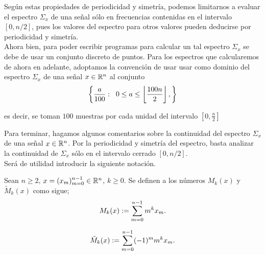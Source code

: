 \begin{nota}
\label{nota: muestreo dom frecuencia}
Según estas propiedades de periodicidad y simetría,
podemos limitarnos a evaluar el espectro
$\Sigma_{x}$ de una señal sólo en frecuencias
contenidas en el intervalo $[0, n/2]$, pues los valores
del espectro para otros valores pueden deducirse por periodicidad
y simetría. \\

Ahora bien, para poder escribir programas
para calcular un tal espectro $\Sigma_{x}$
se debe de usar
un conjunto discreto de puntos.
Para los espectros que calcularemos de ahora en 
adelante, adoptamos la convención de 
usar usar como dominio 
del espectro
$\Sigma_{x}$ de una señal $x \in \mathbb{R}^{n}$
al conjunto
\begin{equation}
\label{eq: malla frecuencias}
\left\{ \frac{a}{100} : \hspace{0.2cm}
0 \leq a \leq 
\left\lfloor\frac{100n}{2}\right\rfloor,
\right\}
\end{equation}

\noindent
es decir, se toman $100$ muestras por
cada unidad del intervalo 
$\left[ 0, \frac{n}{2}\right]$
\end{nota}


Para terminar, hagamos algunos comentarios
sobre la continuidad del espectro $\Sigma_{x}$
de una señal $x \in \mathbb{R}^{n}$.
Por la periodicidad y simetría del espectro, basta
analizar la continuidad de $\Sigma_{x}$ sólo en el
intervalo cerrado $[0, n/2]$. \\

Será de utilidad introducir la siguiente notación.
\begin{defi}
\label{def: momentos de x}
Sean $n \geq 2$, $x= (x_{m})_{m=0}^{n-1} \in \mathbb{R}^{n}$, $k \geq 0$.
Se definen a los números $M_{k}(x)$ y 
$\tilde{M}_{k}(x)$ como sigue;
	\begin{equation}
	\label{eq: momento k esimo de x}
	M_{k}(x) := \sum\limits_{m=0}^{n-1}m^{k}x_{m}.
	\end{equation}
	
	\begin{equation}
	\label{eq: momento skew k esimo de x}
	\tilde{M}_{k}(x) := \sum\limits_{m=0}^{n-1}(-1)^{m}m^{k}x_{m}.
	\end{equation}
\end{defi}


